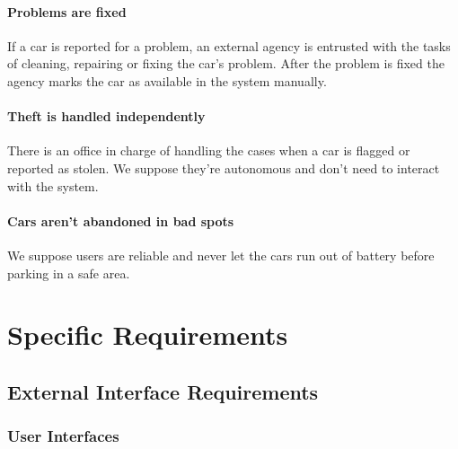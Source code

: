 \documentclass[english]{article}
\begin{document}
\paragraph{Problems are fixed}
If a car is reported for a problem, an external agency is entrusted with the tasks of cleaning, repairing or fixing the car's problem. After the problem is fixed the agency marks the car as available in the system manually.

\paragraph{Theft is handled independently}
There is an office in charge of handling the cases when a car is flagged or reported as stolen.
We suppose they're autonomous and don't need to interact with the system.

\paragraph{Cars aren't abandoned in bad spots}
We suppose users are reliable and never let the cars run out of battery before parking in a safe area.

\newpage

\section{Specific Requirements}

\subsection{External Interface Requirements}

\subsubsection{User Interfaces}


\end{document}
